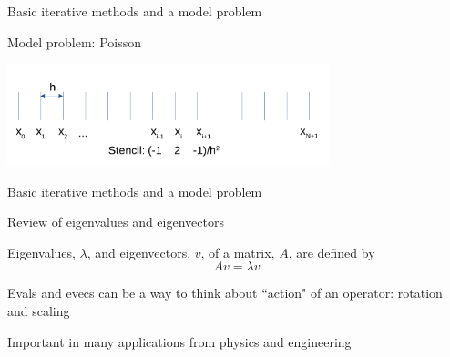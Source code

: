 \documentclass[18pt,xcolor=table]{beamer}
\begin{document}
\begin{frame}{Basic iterative methods and a model problem}
\begin{block}{Model problem: Poisson}
\begin{center}
\includegraphics[width=0.7\textwidth]{../figures/1DFDPoisson}
\end{center}
\end{block}
\end{frame}



\begin{frame}{Basic iterative methods and a model problem}
\begin{block}{Review of eigenvalues and eigenvectors}
\bit
\item Eigenvalues, $\lambda$, and eigenvectors, $v$, of a matrix, $A$, are defined by
\[Av = \lambda v\]
\item Evals and evecs can be a way to think about ``action" of an operator: rotation and scaling
\item Important in many applications from physics and engineering
\eit
\end{block}
\end{frame}
\end{document}
